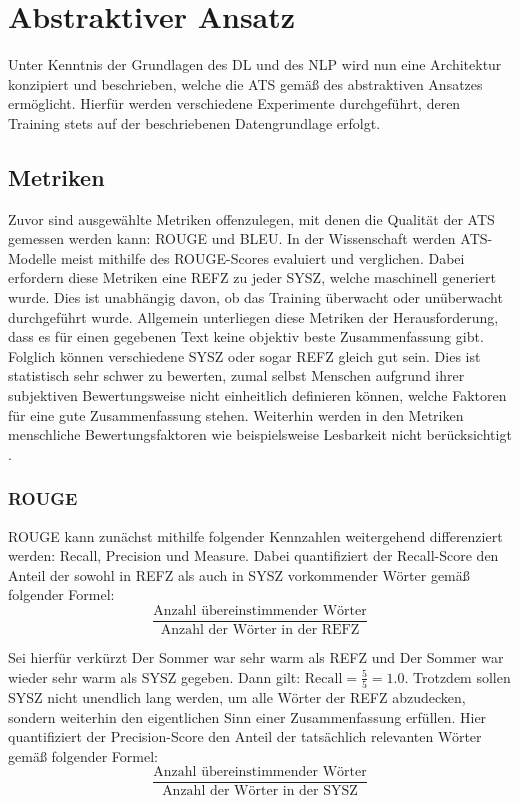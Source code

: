 \chapter{Abstraktiver Ansatz}
\thispagestyle{fancy}
\label{chap:Abstraktiver Ansatz}

\noindent
Unter Kenntnis der Grundlagen des \ac{DL} und des \ac{NLP} wird nun eine Architektur konzipiert und beschrieben, welche die \ac{ATS} gemäß des abstraktiven Ansatzes ermöglicht. Hierfür werden verschiedene Experimente durchgeführt, deren Training stets auf der beschriebenen Datengrundlage erfolgt.\\


\section{Metriken}
\noindent
Zuvor sind ausgewählte Metriken offenzulegen, mit denen die Qualität der \ac{ATS} gemessen werden kann: \ac{ROUGE} und \ac{BLEU}. In der Wissenschaft werden \ac{ATS}-Modelle meist mithilfe des \ac{ROUGE}-Scores evaluiert und verglichen. Dabei erfordern diese Metriken eine \ac{REFZ} zu jeder \ac{SYSZ}, welche maschinell generiert wurde. Dies ist unabhängig davon, ob das Training überwacht oder unüberwacht durchgeführt wurde. Allgemein unterliegen diese Metriken der Herausforderung, dass es für einen gegebenen Text keine objektiv beste Zusammenfassung gibt. Folglich können verschiedene \ac{SYSZ} oder sogar \ac{REFZ} gleich gut sein. Dies ist statistisch sehr schwer zu bewerten, zumal selbst Menschen aufgrund ihrer subjektiven Bewertungsweise nicht einheitlich definieren können, welche Faktoren für eine gute Zusammenfassung stehen. Weiterhin werden in den Metriken menschliche Bewertungsfaktoren wie beispielsweise Lesbarkeit nicht berücksichtigt \cite{LEM20}.\\


\subsection{ROUGE}
\noindent
\ac{ROUGE} kann zunächst mithilfe folgender Kennzahlen weitergehend differenziert werden: Recall, Precision und Measure. Dabei quantifiziert der Recall-Score den Anteil der sowohl in \ac{REFZ} als auch in \ac{SYSZ} vorkommender Wörter gemäß folgender Formel:\\
$$\frac{\text{Anzahl übereinstimmender Wörter}}{\text{Anzahl der Wörter in der REFZ}}$$
\newpage

\noindent
Sei hierfür verkürzt \glqq Der Sommer war sehr warm\grqq{} als \ac{REFZ} und \glqq Der Sommer war wieder sehr warm\grqq{} als \ac{SYSZ} gegeben. Dann gilt: $\text{Recall} = \frac{5}{5} = 1.0$. Trotzdem sollen \ac{SYSZ} nicht unendlich lang werden, um alle Wörter der \ac{REFZ} abzudecken, sondern weiterhin den eigentlichen Sinn einer Zusammenfassung erfüllen. Hier quantifiziert der Precision-Score den Anteil der tatsächlich relevanten Wörter gemäß folgender Formel:\\
$$\frac{\text{Anzahl übereinstimmender Wörter}}{\text{Anzahl der Wörter in der SYSZ}}$$ \newline

